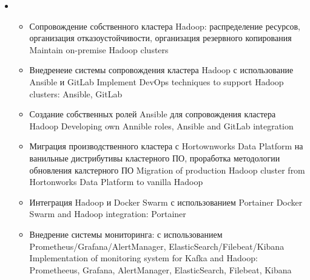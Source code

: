 \documentclass[11pt,a4paper,sans, russian]{moderncv}        %
\begin{document}
{\begin{itemize}
\begin{itemize}
				{Участие в проектах для MS SQL Server}
				{Participation in projects for MS SQL Server}
      		\item {}
      			{Внедрение и сопровождение СУБД PostgreSQL в кластерном режиме, интеграция с Hadoop с использованием KafkaConnect и Debezium}
      			{Integration cluster PostgreSQL with Hadoop: Patroni}
		\end{itemize}
		\item {}
		\begin{itemize}
			\item {}
				{Сопровождение собственного кластера Hadoop: распределение ресурсов, организация отказоустойчивости, организация резервного копирования}
				{Maintain on-premise Hadoop clusters}
			\item {}
				{Внедренеие системы сопровождения кластера Hadoop с использование Ansible и GitLab}
				{Implement DevOps techniques to support Hadoop clusters: Ansible, GitLab}
			\item {}
				{Создание собственных ролей Ansible для сопровождения кластера Hadoop}
				{Developing own Annible roles, Ansible and GitLab integration}
			\item {}
				{Миграция производственного кластера с Hortownworks Data Platform на ванильные дистрибутивы кластерного ПО, проработка методологии обновления калстерного ПО}
				{Migration of production Hadoop cluster from Hortonworks Data Platform to vanilla Hadoop}
			\item {}
				{Интеграция Hadoop и Docker Swarm с использованием Portainer}
				{Docker Swarm and Hadoop integration: Portainer}
			\item {}
				{Внедрение системы мониторинга: с использованием Prometheus/Grafana/AlertManager, ElasticSearch/Filebeat/Kibana}
				{Implementation of monitoring system for Kafka and Hadoop: Prometheeus, Grafana, AlertManager, ElasticSearch, Filebeat, Kibana}
		\end{itemize}
	\end{itemize}
}
\end{document}
